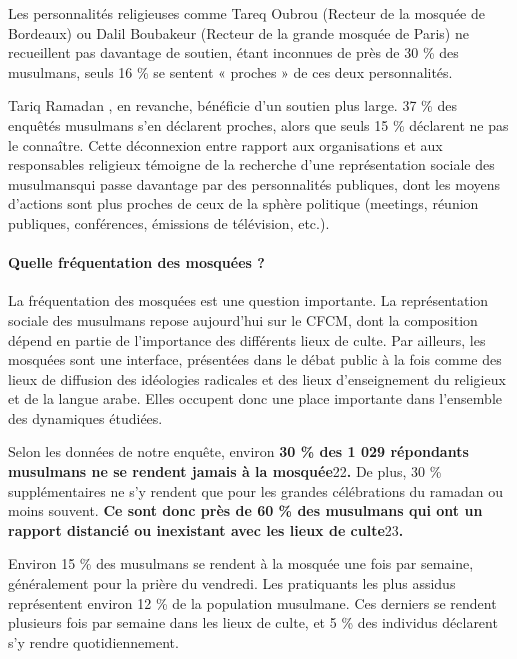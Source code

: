 Les personnalités religieuses comme Tareq Oubrou (Recteur de la mosquée
de Bordeaux) ou Dalil Boubakeur (Recteur de la grande mosquée de Paris)
ne recueillent pas davantage de soutien, étant inconnues de près de 30
\% des musulmans, seuls 16 \% se sentent « proches » de ces deux
personnalités.

Tariq Ramadan \label{Theol:TRamadan1}, en revanche, bénéficie d'un soutien plus large. 37 \% des
enquêtés musulmans s'en déclarent proches, alors que seuls 15 \%
déclarent ne pas le connaître. Cette déconnexion entre rapport aux
organisations et aux responsables religieux témoigne de la recherche
d'une représentation sociale des musulmansqui passe davantage par des personnalités publiques, dont les moyens
d'actions sont plus proches de ceux de la sphère politique (meetings,
réunion publiques, conférences, émissions de télévision, etc.).



\paragraph{Quelle fréquentation des mosquées
?}


La fréquentation des mosquées est une question importante. La
représentation sociale des musulmans repose aujourd'hui sur le CFCM,
dont la composition dépend en partie de l'importance des différents
lieux de culte. Par ailleurs, les mosquées sont une interface,
présentées dans le débat public à la fois comme des lieux de diffusion
des idéologies radicales et des lieux d'enseignement du religieux et de
la langue arabe. Elles occupent donc une place importante dans
l'ensemble des dynamiques étudiées.

Selon les données de notre enquête, environ \textbf{30 \% des 1 029
répondants musulmans ne se rendent jamais à la mosquée}22\textbf{.} De
plus, 30 \% supplémentaires ne s'y rendent que pour les grandes
célébrations du ramadan ou moins souvent. \textbf{Ce sont donc près de
60 \% des musulmans qui ont un rapport distancié ou inexistant avec les
lieux de culte}23\textbf{.}

Environ 15 \% des musulmans se rendent à la mosquée une fois par
semaine, généralement pour la prière du vendredi. Les pratiquants les
plus assidus représentent environ 12 \% de la population musulmane. Ces
derniers se rendent plusieurs fois par semaine dans les lieux de culte,
et 5 \% des individus déclarent s'y rendre quotidiennement. 

